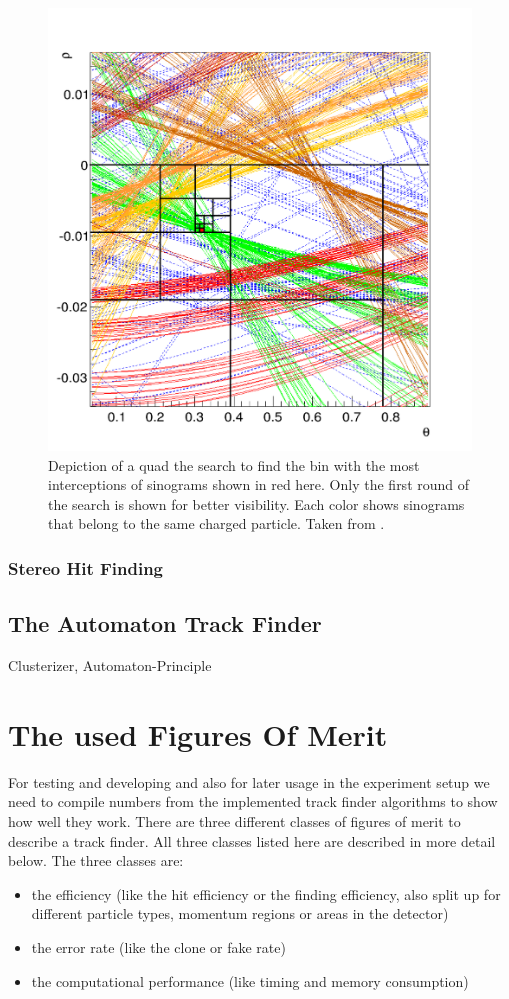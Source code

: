\begin{figure}
  \centering
  \includegraphics[width=0.6\linewidth]{figures/theory/quad_tree.png}
  \caption{Depiction of a quad the search to find the bin with the most interceptions of sinograms shown in red here. Only the first round of the search is shown for better visibility. Each color shows sinograms that belong to the same charged particle. Taken from \cite{viktor_dpg}.}
  \label{fig-quad-tree-search}
\end{figure}


\subsubsection{Stereo Hit Finding}


\subsection{The Automaton Track Finder}
Clusterizer, Automaton-Principle


\section{The used Figures Of Merit}

For testing and developing and also for later usage in the experiment setup we need to compile numbers from the implemented track finder algorithms to show how well they work. There are three different classes of figures of merit to describe a track finder. All three classes listed here are described in more detail below. The three classes are:
\begin{itemize}
  \item the efficiency (like the hit efficiency or the finding efficiency, also split up for different particle types, momentum regions or areas in the detector)
  \item the error rate (like the clone or fake rate)
  \item the computational performance (like timing and memory consumption)
\end{itemize}

